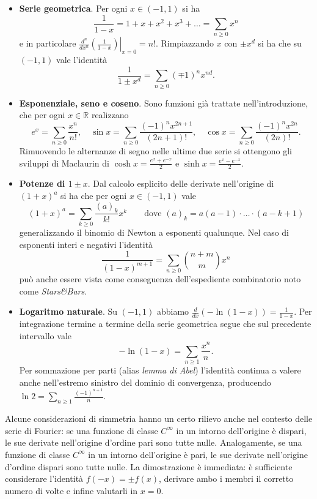 \documentclass[a4paper,twoside]{article}
\newcommand{\R}{\mathbb{R}}
\theoremstyle{definition}
\numberwithin{theorem}{section}
\begin{document}
\begin{itemize}
 \item \textbf{Serie geometrica}. Per ogni $x\in(-1,1)$ si ha 
 $$ \frac{1}{1-x}=1+x+x^2+x^3+\ldots = \sum_{n\geq 0}x^n $$
 e in particolare $\left.\frac{d^n}{dx^n}\left(\frac{1}{1-x}\right)\right|_{x=0}=n!$. Rimpiazzando $x$ con $\pm x^d$ si ha che su $(-1,1)$ vale l'identità 
 $$ \frac{1}{1\pm x^d} = \sum_{n\geq 0}(\mp 1)^n x^{nd}. $$
 \item \textbf{Esponenziale, seno e coseno}. Sono funzioni già trattate nell'introduzione, che per ogni $x\in\R$ realizzano 
 $$ e^x = \sum_{n\geq 0}\frac{x^n}{n!},\quad \sin x=\sum_{n\geq 0}\frac{(-1)^n x^{2n+1}}{(2n+1)!}, \quad \cos x=\sum_{n\geq 0}\frac{(-1)^n x^{2n}}{(2n)!}. $$
 Rimuovendo le alternanze di segno nelle ultime due serie si ottengono gli sviluppi di Maclaurin di $\cosh x=\frac{e^x+e^{-x}}{2}$ e $\sinh x=\frac{e^x-e^{-x}}{2}$.
 \item \textbf{Potenze di $1\pm x$}. Dal calcolo esplicito delle derivate nell'origine di $(1+x)^{a}$ si ha che per ogni $x\in(-1,1)$ vale 
 $$ (1+x)^a = \sum_{k\geq 0}\frac{(a)_k}{k!} x^k\qquad\text{dove }(a)_k = a(a-1)\cdot\ldots\cdot (a-k+1) $$
 generalizzando il binomio di Newton a esponenti qualunque. Nel caso di esponenti interi e negativi l'identità 
 $$ \frac{1}{(1-x)^{m+1}} = \sum_{n\geq 0}\binom{n+m}{m} x^n $$
 può anche essere vista come conseguenza dell'espediente combinatorio noto come \emph{Stars\&Bars}.
 \item \textbf{Logaritmo naturale}. Su $(-1,1)$ abbiamo $\frac{d}{dx}\left(-\ln(1-x)\right)=\frac{1}{1-x}$. Per integrazione termine a termine della serie geometrica segue che sul precedente intervallo vale 
 $$ -\ln(1-x) = \sum_{n\geq 1}\frac{x^n}{n}. $$
 Per sommazione per parti (alias \emph{lemma di Abel}) l'identità continua a valere anche nell'estremo sinistro del dominio di convergenza, producendo $\ln 2 = \sum_{n\geq 1}\frac{(-1)^{n+1}}{n}$.
 
\end{itemize}

Alcune considerazioni di simmetria hanno un certo rilievo anche nel contesto delle serie di Fourier: se una funzione di classe $C^\infty$ in un intorno dell'origine è dispari, le sue derivate nell'origine d'ordine pari sono tutte nulle. Analogamente, se una funzione di classe $C^\infty$ in un intorno dell'origine è pari, le sue derivate nell'origine d'ordine dispari sono tutte nulle. La dimostrazione è immediata: è sufficiente considerare l'identità $f(-x)=\pm f(x)$, derivare ambo i membri il corretto numero di volte e infine valutarli in $x=0$.\\
\end{document}
